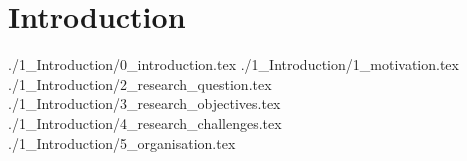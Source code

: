 \chapter{Introduction}
{./1_Introduction/0_introduction.tex}
{./1_Introduction/1_motivation.tex}
{./1_Introduction/2_research_question.tex}
{./1_Introduction/3_research_objectives.tex}
{./1_Introduction/4_research_challenges.tex}
{./1_Introduction/5_organisation.tex}